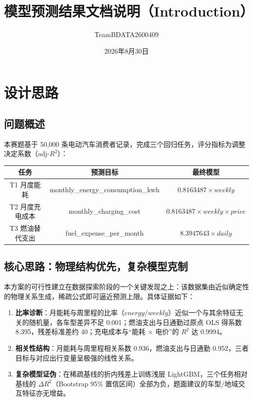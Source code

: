 \documentclass[12pt,a4paper]{ctexart}
\title{模型预测结果文档说明（Introduction）}
\author{TeamBDATA2600409}
\date{2026年8月30日}
\begin{document}
\maketitle

\section{设计思路}

\subsection{问题概述}

本赛题基于 50,000 条电动汽车消费者记录，完成三个回归任务，评分指标为调整决定系数（adj-$R^2$）：

\begin{table}[h]
\centering
\begin{tabular}{ccc}
\toprule
\textbf{任务} & \textbf{预测目标} & \textbf{最终模型} \\
\midrule
T1 月度能耗 & monthly\_energy\_consumption\_kwh & $0.8163487 \times weekly$ \\
T2 月度充电成本 & monthly\_charging\_cost & $0.8163487 \times weekly \times price$ \\
T3 燃油替代支出 & fuel\_expense\_per\_month & $8.3947643 \times daily$ \\
\bottomrule
\end{tabular}
\end{table}

\subsection{核心思路：物理结构优先，复杂模型克制}

本方案的可行性建立在数据探索阶段的一个关键发现之上：该数据集由近似确定性的物理关系生成，稀疏公式即可逼近预测上限。具体证据如下：

\begin{enumerate}[itemsep=0pt]
\item \textbf{比率诊断}：月能耗与周里程的比率（$energy/weekly$）近似一个与其余特征无关的随机量，各车型差异不足 0.001；燃油支出与日通勤过原点 OLS 得系数 8.395，残差标准差约 40；充电成本与``能耗 $\times$ 电价''的 $R^2$ 达 0.9994。
\item \textbf{相关性结构}：月能耗与周里程相关系数 0.936，燃油支出与日通勤 0.952，三者目标与对应出行变量呈极强的线性关系。
\item \textbf{复杂模型证伪}：在稀疏基线的折内残差上训练浅层 LightGBM，三个任务相对基线的 $\Delta R^2$（Bootstrap 95\% 置信区间）全部为负，题面建议的车型/地域交互特征亦无增益。
\end{enumerate}
\end{document}
